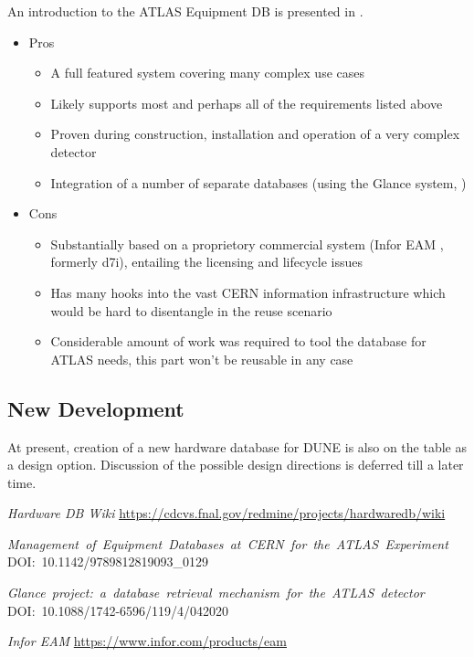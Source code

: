\documentclass[pdftex,12pt,letter]{article}
\begin{document}
An introduction to the ATLAS Equipment DB is presented in \cite{atlasequipmentdb}.

\begin{itemize}

\item Pros
\begin{itemize}
\item A full featured system covering many complex use cases
\item Likely supports most and perhaps all of the requirements listed above
\item Proven during construction, installation and operation of a very complex detector
\item Integration of a number of separate databases (using the Glance system, \cite{glance})
\end{itemize}

\item Cons
\begin{itemize}
\item Substantially based on a proprietory commercial system (Infor EAM \cite{infor}, formerly d7i), entailing the licensing and lifecycle issues
\item Has many hooks into the vast CERN information infrastructure which would be hard to disentangle in the reuse scenario
\item Considerable amount of work was required to tool the database for ATLAS needs, this part won't be reusable in any case
\end{itemize}

\end{itemize}

\subsection{New Development}
At present, creation of a new hardware database for DUNE is also on the table as a design option.
Discussion of the possible design directions is deferred till a later time.




\begin{thebibliography}{1}

{\textit{Hardware DB Wiki} \url{https://cdcvs.fnal.gov/redmine/projects/hardwaredb/wiki}}

{\textit{\mbox{Management of Equipment Databases at CERN for the ATLAS Experiment}}
\mbox{DOI: 10.1142/9789812819093\_0129}
}

{\textit{\mbox{Glance project: a database retrieval mechanism for the ATLAS detector}}
\mbox{DOI: 10.1088/1742-6596/119/4/042020}
}

{\textit{Infor EAM} \url{https://www.infor.com/products/eam}}

\end{thebibliography}
\end{document}
